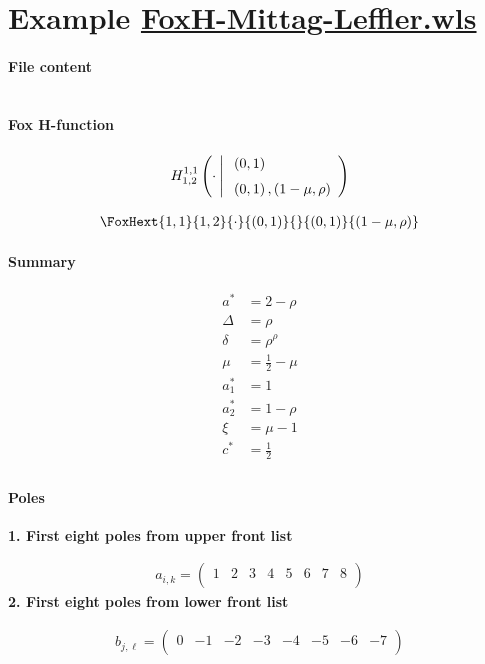 \documentclass[11pt]{article}
\begin{document}
\section{Example \url{FoxH-Mittag-Leffler.wls}}

\paragraph{File content}

\inputminted{text}{FoxH-Mittag-Leffler.wls}

\paragraph{Fox H-function}

\begin{align*}
  \FoxH
    {1,1}
    {1,2}
    {\cdot}
    {\left(0, 1\right)}
    {\left(0, 1\right), \left(1-\mu, \rho\right)}
\end{align*}

\begin{align*}
  \FoxHext
    {1,1}
    {1,2}
    {\cdot}
    {\left(0, 1\right)}
    {}
    {\left(0, 1\right)}
    {\left(1-\mu, \rho\right)}
\end{align*}

\paragraph{Summary}

\begin{align*}
  a^*    & = 2-\rho \\
  \Delta & = \rho \\
  \delta & = \rho ^{\rho } \\
  \mu    & = \frac{1}{2}-\mu \\
  a_1^*  & = 1 \\
  a_2^*  & = 1-\rho \\
  \xi    & = \mu -1 \\
  c^*    & = \frac{1}{2} \\
\end{align*}

\paragraph{Poles}

\noindent\textbf{1. First eight poles from upper front list}

\begin{align*}
  a_{i,k} = 
  \left(
\begin{array}{cccccccc}
 1 & 2 & 3 & 4 & 5 & 6 & 7 & 8 \\
\end{array}
\right)
\end{align*}
\noindent\textbf{2. First eight poles from lower front list}

\begin{align*}
  b_{j,\ell} = 
  \left(
\begin{array}{cccccccc}
 0 & -1 & -2 & -3 & -4 & -5 & -6 & -7 \\
\end{array}
\right)
\end{align*}

\printbibliography[title={References}]
\end{document}
